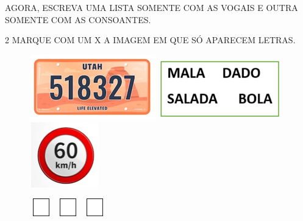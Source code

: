 \item AGORA, ESCREVA UMA LISTA SOMENTE COM AS VOGAIS E OUTRA SOMENTE COM AS CONSOANTES.


\num{2} MARQUE COM UM X A IMAGEM EM QUE SÓ APARECEM LETRAS.

\begin{figure}[htpb!]
\includegraphics[width=2.18819in,height=1.11111in]{media/image2.png}
\includegraphics[width=2.03681in,height=1.04861in]{media/image3.png}
\includegraphics[width=1.20556in,height=1.11111in]{media/image4.png}

\hspace{2cm}\includegraphics[width=0.40972in,height=0.30069in]{media/image5.png}
\hspace{4.5cm}\includegraphics[width=0.40972in,height=0.30069in]{media/image5.png}
\hspace{3cm}\includegraphics[width=0.40972in,height=0.30069in]{media/image5.png}
\end{figure}

